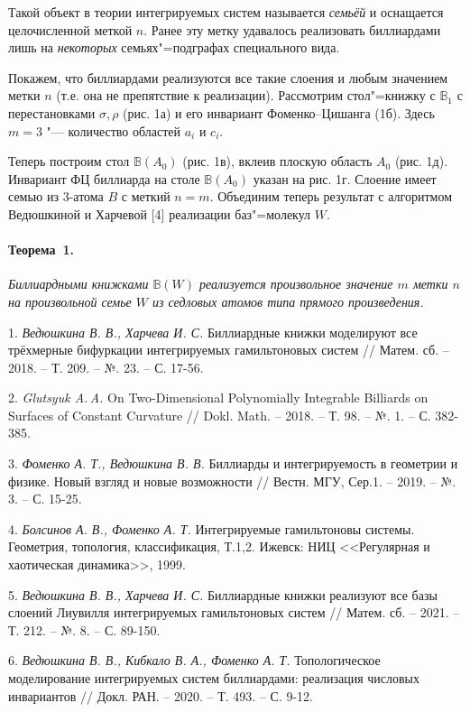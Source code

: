 Такой объект в теории интегрируемых систем называется \textit{семьёй} и оснащается целочисленной меткой $n$. Ранее эту метку удавалось реализовать биллиардами лишь на \textit{некоторых} семьях"=подграфах специального вида. %

Покажем, что биллиардами реализуются все такие слоения и любым значением метки $n$ (т.е. она не препятствие к реализации). Рассмотрим стол"=книжку с $\mathbb{B}_1$ с перестановками $\sigma, \rho$ (рис. 1а) и его инвариант Фоменко--Цишанга (1б). Здесь $m = 3$ "--- количество областей $a_i$ и $c_i$.

Теперь построим стол $\mathbb{B}(A_0)$ (рис. 1в), вклеив плоскую область $A_0$ (рис. 1д). Инвариант ФЦ биллиарда на столе $\mathbb{B}(A_0)$ указан на рис. 1г. Слоение имеет семью из 3-атома $B$ с меткий $n = m$. Объединим теперь результат с алгоритмом Ведюшкиной и Харчевой [4] реализации баз"=молекул $W$.

\paragraph{Теорема~1.}
{\it
	Биллиардными книжками $\mathbb{B}(W)$ реализуется произвольное значение $m$ метки $n$ на произвольной семье $W$ из седловых атомов типа прямого произведения.
}


\begin{figure}[h]
	\label{elementarybilliards}
\end{figure}


\litlist

1. {\it Ведюшкина В. В., Харчева И. С.}
Биллиардные книжки моделируют все трёхмерные бифуркации интегрируемых гамильтоновых систем // Матем. сб. – 2018. – Т. 209. – №. 23. – С. 17-56.

2. {\it Glutsyuk A.\,A.} On Two-Dimensional Polynomially Integrable Billiards
on Surfaces of Constant Curvature // Dokl. Math. – 2018. – Т. 98. – №. 1. – С. 382-385.

3. {\it Фоменко А. Т., Ведюшкина В. В.} Биллиарды и интегрируемость в геометрии и физике. Новый взгляд и новые возможности // Вестн. МГУ, Сер.1. – 2019. – №. 3. – С. 15-25.

4. {\it Болсинов А. В., Фоменко А. Т.}
Интегрируемые гамильтоновы системы. Геометрия, топология, классификация, Т.1,2.
Ижевск: НИЦ <<Регулярная и хаотическая динамика>>, 1999.

5. {\it Ведюшкина В. В., Харчева И. С.}
Биллиардные книжки реализуют все базы слоений Лиувилля интегрируемых гамильтоновых систем // Матем. сб. – 2021. – Т. 212. – №. 8. – С. 89-150.

6. {\it Ведюшкина В. В., Кибкало В. А., Фоменко А. Т.} Топологическое моделирование интегрируемых систем биллиардами: реализация числовых инвариантов // Докл. РАН. – 2020. – Т. 493. – С. 9-12.
